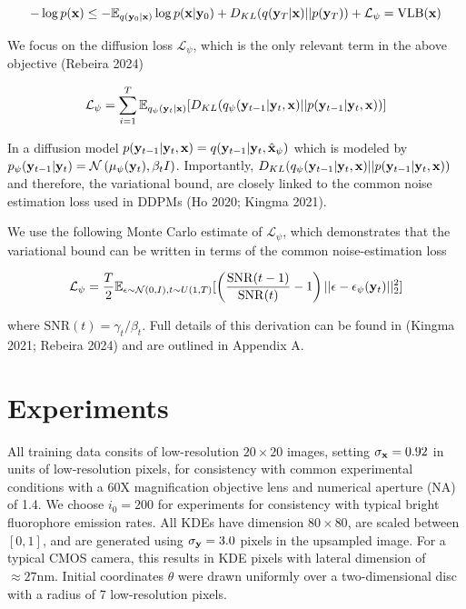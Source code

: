 \documentclass{article}
\begin{document}
\begin{equation}
-\log p(\bold{x}) \leq -\mathbb{E}_{q(\bold{y}_{0}|\bold{x})} \log p(\bold{x}|\bold{y}_{0}) + D_{KL}(q(\bold{y}_{T}|\bold{x}) || p(\bold{y}_{T})) + \mathcal{L}_{\psi} = \mathrm{VLB}(\bold{x})
\end{equation}

We focus on the diffusion loss $\mathcal{L}_{\psi}$, which is the only relevant term in the above objective (Rebeira 2024)

\begin{equation}
\mathcal{L}_{\psi} = \sum_{i=1}^{T} \mathbb{E}_{q_{\psi}(\bold{y}_{t}|\bold{x})} [ D_{KL}(q_{\psi}(\bold{y}_{t-1}|\bold{y}_{t},\bold{x}) || p(\bold{y}_{t-1}|\bold{y}_{t},\bold{x})) ]
\end{equation}

In a diffusion model $p(\bold{y}_{t-1}|\bold{y}_{t},\bold{x}) = q(\bold{y}_{t-1}|\bold{y}_{t},\hat{\bold{x}}_{\psi})$ which is modeled by $p_{\psi}(\bold{y}_{t-1}|\bold{y}_{t}) = \mathcal{N}\left(\mu_{\psi}(\bold{y}_{t}),\beta_{t}I\right)$. Importantly, $D_{KL}(q_{\psi}(\bold{y}_{t-1}|\bold{y}_{t},\bold{x}) || p(\bold{y}_{t-1}|\bold{y}_{t},\bold{x}))$ and therefore, the variational bound, are closely linked to the common noise estimation loss used in DDPMs (Ho 2020; Kingma 2021). 

We use the following Monte Carlo estimate of $\mathcal{L}_{\psi}$, which demonstrates that the variational bound can be written in terms of the common noise-estimation loss

\begin{equation}
\mathcal{L}_{\psi} = \frac{T}{2}\mathbb{E}_{\epsilon\sim \mathcal{N}(0,I),t\sim U(1,T)}[\left(\frac{\mathrm{SNR}(t-1)}{\mathrm{SNR}(t)}-1\right)\lvert\lvert \bold{\epsilon}-\bold{\epsilon}_{\psi}(\bold{y}_{t})\lvert\lvert_{2}^{2}]
\end{equation}

where $\mathrm{SNR}(t) = \gamma_{t}/\beta_{t}$. Full details of this derivation can be found in (Kingma 2021; Rebeira 2024) and are outlined in Appendix A. 


\section{Experiments}

All training data consits of low-resolution $20\times 20$ images, setting $\sigma_{\bold{x}}=0.92$ in units of low-resolution pixels, for consistency with common experimental conditions with a 60X magnification objective lens and numerical aperture (NA) of 1.4. We choose $i_{0}=200$ for experiments for consistency with typical bright fluorophore emission rates. All KDEs have dimension $80\times 80$, are scaled between $[0,1]$, and are generated using $\sigma_{\bold{y}}=3.0$ pixels in the upsampled image. For a typical CMOS camera, this results in KDE pixels with lateral dimension of $\approx 27\mathrm{nm}$. Initial coordinates $\theta$ were drawn uniformly over a two-dimensional disc with a radius of 7 low-resolution pixels.
\end{document}

